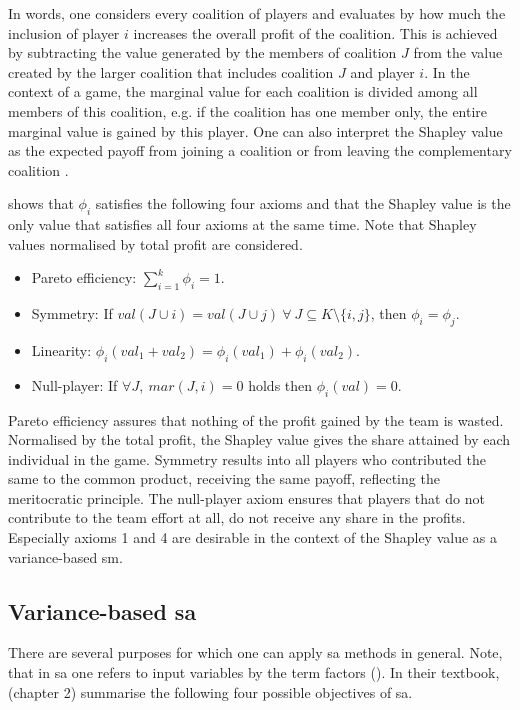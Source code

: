 In words, one considers every coalition of players and evaluates by how much the inclusion of player $i$ increases the overall profit of the coalition. This is achieved by subtracting the value generated by the members of coalition $J$ from the value created by the larger coalition that includes coalition $J$ and player $i$. In the context of a game, the marginal value for each coalition is divided among all members of this coalition, e.g. if the coalition has one member only, the entire marginal value is gained by this player. One can also interpret the Shapley value as the expected payoff from joining a coalition or from leaving the complementary coalition \cite{PRB20}.

\cite{S53} shows that $\phi_i$ satisfies the following four axioms and that the Shapley value is the only value that satisfies all four axioms at the same time. Note that Shapley values normalised by total profit are considered.

\begin{itemize}
    \item Pareto efficiency: $\sum_{i=1}^{k}\phi_i=1$.
	\item Symmetry: If $val(J \cup {i})=val(J \cup {j})\ \forall\ J \subseteq K \setminus{\{i, j\}}$, then $\phi_i = \phi_j$.
	\item Linearity: $\phi_i(val_1 + val_2)=\phi_i(val_1)+\phi_i(val_2)$.
	\item Null-player: If $\forall J,\ mar(J, i) = 0$ holds then $\phi_i(val) = 0$.
\end{itemize}

Pareto efficiency assures that nothing of the profit gained by the team is wasted. Normalised by the total profit, the Shapley value gives the share attained by each individual in the game. Symmetry results into all players who contributed the same to the common product, receiving the same payoff, reflecting the meritocratic principle. The null-player axiom ensures that players that do not contribute to the team effort at all, do not receive any share in the profits. Especially axioms 1 and 4 are desirable in the context of the Shapley value as a variance-based sm.

\subsection{Variance-based sa} \label{var_based_sa}

There are several purposes for which one can apply sa methods in general. Note, that in sa one refers to input variables by the term factors (\cite{R21}). In their textbook, \cite{STC04} (chapter 2) summarise the following four possible objectives of sa.

